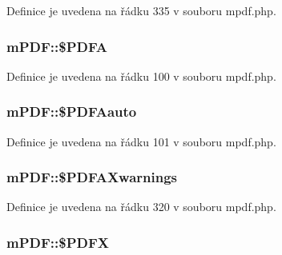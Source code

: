 Definice je uvedena na řádku 335 v souboru mpdf.\-php.

\hypertarget{classm_p_d_f_a063fffc945a7c98b9864bc450c3ea514}{
\subsubsection[{\$\-P\-D\-F\-A}]{\setlength{\rightskip}{0pt plus 5cm}m\-P\-D\-F\-::\$\-P\-D\-F\-A}}\label{classm_p_d_f_a063fffc945a7c98b9864bc450c3ea514}


Definice je uvedena na řádku 100 v souboru mpdf.\-php.

\hypertarget{classm_p_d_f_aa1c216c47a477a722e477ebb6400ece2}{
\subsubsection[{\$\-P\-D\-F\-Aauto}]{\setlength{\rightskip}{0pt plus 5cm}m\-P\-D\-F\-::\$\-P\-D\-F\-Aauto}}\label{classm_p_d_f_aa1c216c47a477a722e477ebb6400ece2}


Definice je uvedena na řádku 101 v souboru mpdf.\-php.

\hypertarget{classm_p_d_f_aa664c198e17780a3e4f6ac6414a5bec0}{
\subsubsection[{\$\-P\-D\-F\-A\-Xwarnings}]{\setlength{\rightskip}{0pt plus 5cm}m\-P\-D\-F\-::\$\-P\-D\-F\-A\-Xwarnings}}\label{classm_p_d_f_aa664c198e17780a3e4f6ac6414a5bec0}


Definice je uvedena na řádku 320 v souboru mpdf.\-php.

\hypertarget{classm_p_d_f_a5fb2a2cf0840146efe5d546c5a0b1bbc}{
\subsubsection[{\$\-P\-D\-F\-X}]{\setlength{\rightskip}{0pt plus 5cm}m\-P\-D\-F\-::\$\-P\-D\-F\-X}}\label{classm_p_d_f_a5fb2a2cf0840146efe5d546c5a0b1bbc}


